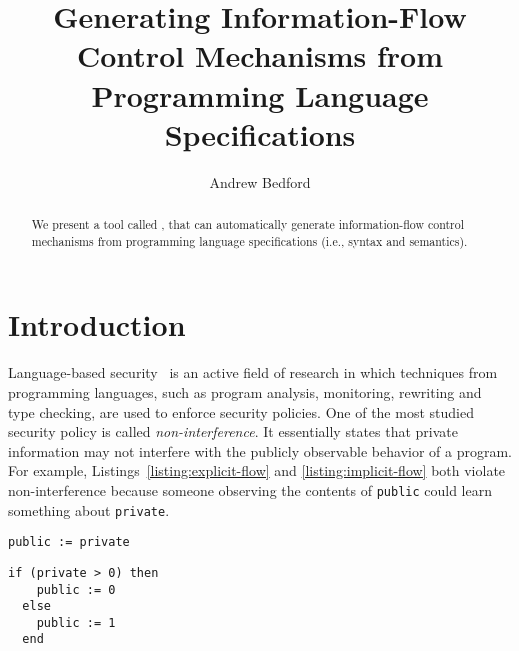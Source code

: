 \documentclass[sigplan,10pt]{acmart}\settopmatter{printfolios=true,printccs=false,printacmref=false}
\begin{document}
\title[ott-ifc]{Generating Information-Flow Control Mechanisms from Programming Language Specifications}


\author{Andrew Bedford}


\begin{abstract}
We present a tool called \ottifc, that can automatically generate information-flow control mechanisms from programming language specifications (i.e., syntax and semantics).
\end{abstract}

\maketitle

\section{Introduction}
Language-based security~\cite{DBLP:conf/dagstuhl/SchneiderMH01} is an active field of research in which techniques from programming languages, such as program analysis, monitoring, rewriting and type checking, are used to enforce security policies. One of the most studied security policy is called \emph{non-interference}. It essentially states that private information may not interfere with the publicly observable behavior of a program. For example, Listings~\ref{listing:explicit-flow} and \ref{listing:implicit-flow} both violate non-interference because someone observing the contents of \lstinline{public} could learn something about \lstinline{private}.

\begin{lstlisting}[captionpos=b, caption=Insecure explicit flow, label=listing:explicit-flow]
  public := private
\end{lstlisting}

\begin{lstlisting}[captionpos=b, caption=Insecure implicit flow, label=listing:implicit-flow]
  if (private > 0) then
    public := 0
  else
    public := 1
  end
\end{lstlisting}
\end{document}
